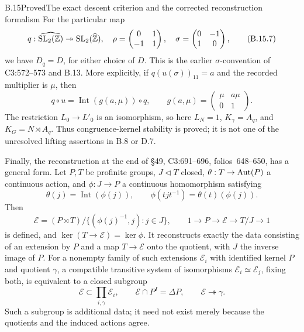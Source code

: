 \begin{statement}{B.15}{Proved}{The exact descent criterion and the corrected reconstruction formalism}
For the particular map
\[
 q:\widehat{\operatorname{SL}_2(\mathbb Z)}\twoheadrightarrow\operatorname{SL}_2(\widehat{\mathbb Z}),
 \quad
 \rho=\begin{pmatrix}0&1\\-1&1\end{pmatrix},\quad
 \sigma=\begin{pmatrix}0&-1\\1&0\end{pmatrix},
 \tag{B.15.7}
\]
we have \(D_q=D\), for either choice of \(D\). This is the earlier
\(\sigma\)-convention of C3:572--573 and B.13.
More explicitly, if \(q(u(\sigma))_{11}=a\) and the recorded
multiplier is \(\mu\), then
\[
 q\circ u=\operatorname{Int}(g(a,\mu))\circ q,
 \qquad g(a,\mu)=\begin{pmatrix}\mu&a\mu\\0&1\end{pmatrix}.
 \tag{B.15.8}
\]
The restriction \(L_0\to L'_0\) is an isomorphism, so here
\(L_N=1\), \(K_\gamma=A_q\), and \(K_G=N\rtimes A_q\).
Thus congruence-kernel stability is proved; it is not one of the
unresolved lifting assertions in B.8 or D.7.

Finally, the reconstruction at the end of \S49, C3:691--696,
folios~648--650, has a general form. Let \(P,T\) be profinite
groups, \(J\triangleleft T\) closed, \(\theta:T\to\operatorname{Aut}(P)\)
a continuous action, and \(\phi:J\to P\) a continuous homomorphism
satisfying
\[
 \theta(j)=\operatorname{Int}(\phi(j)),\qquad
 \phi(tjt^{-1})=\theta(t)(\phi(j)).
 \tag{B.15.9}
\]
Then
\[
 \mathcal E=(P\rtimes T)/
      \{(\phi(j)^{-1},j):j\in J\},\qquad
 1\longrightarrow P\longrightarrow\mathcal E
     \longrightarrow T/J\longrightarrow1
 \tag{B.15.10}
\]
is defined, and \(\ker(T\to\mathcal E)=\ker\phi\).
It reconstructs exactly the data consisting of an extension by
\(P\) and a map \(T\to\mathcal E\) onto the quotient, with
\(J\) the inverse image of \(P\). For a nonempty family of such
extensions \(\mathcal E_i\) with identified kernel \(P\) and
quotient \(\gamma\), a compatible transitive system of
isomorphisms \(\mathcal E_i\simeq\mathcal E_j\), fixing both,
is equivalent to a closed subgroup
\[
 \mathcal E\subset\prod_{i,\gamma}\mathcal E_i,
 \qquad \mathcal E\cap P^I=\Delta P,
 \qquad \mathcal E\twoheadrightarrow\gamma.
 \tag{B.15.11}
\]
Such a subgroup is additional data; it need not exist merely
because the quotients and the induced actions agree.
\end{statement}

